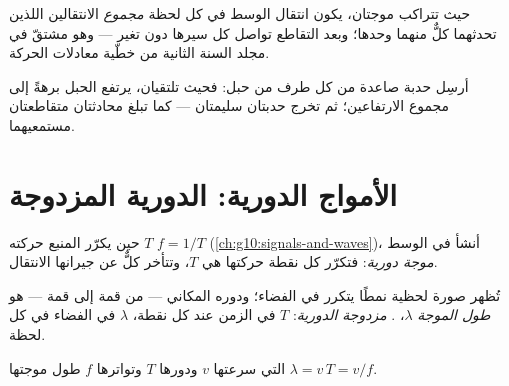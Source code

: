 \begin{proposition}\label{prop:g12:mechanical-waves:superposition}
حيث تتراكب موجتان، يكون انتقال الوسط في كل
لحظة \emph{مجموع} الانتقالين اللذين تحدثهما كلٌّ منهما وحدها؛
وبعد التقاطع تواصل كل  سيرها دون تغير --- وهو مشتقّ في
مجلد السنة الثانية من خطّية معادلات الحركة. \admitted
\end{proposition}

\begin{example}\label{ex:g12:mechanical-waves:crossing}
أرسِل حدبة صاعدة من كل طرف من حبل: فحيث تلتقيان، يرتفع
الحبل برهةً إلى مجموع الارتفاعين؛ ثم تخرج حدبتان سليمتان
--- كما تبلغ محادثتان متقاطعتان مستمعيهما.
\end{example}

\section{الأمواج الدورية: الدورية المزدوجة}

\begin{definition}\label{def:g12:mechanical-waves:periodic}
حين يكرّر المنبع حركته  $T$ 
$f = 1/T$ (\cref{ch:g10:signals-and-waves})، أنشأ في الوسط
\emph{موجة دورية}: فتكرّر كل نقطة حركتها
هي  $T$، وتتأخر كلٌّ عن جيرانها  الانتقال.
\end{definition}

\begin{definition}\label{def:g12:mechanical-waves:wavelength}
تُظهر صورة لحظية  نمطًا يتكرر في الفضاء؛ ودوره
المكاني --- من قمة إلى قمة --- هو
\emph{طول الموجة} $\lambda$، .  \emph{مزدوجة الدورية}:  $T$
في الزمن عند كل نقطة،  $\lambda$ في الفضاء في كل لحظة.
\end{definition}

\begin{theorem}\label{thm:g12:mechanical-waves:relation}
 التي سرعتها $v$ ودورها $T$ وتواترها $f$ طول
موجتها $\lambda = v\,T = v/f$.
\end{theorem}

